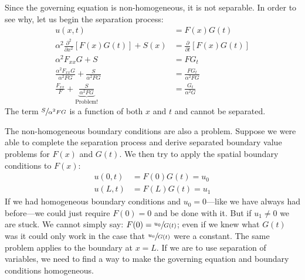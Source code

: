 Since the governing equation is non-homogeneous, it is not separable.  In order to see why, let us begin the separation process:
\begin{align*}
u(x,t) &= F(x)G(t) \\
\alpha^2 \frac{\partial^2}{\partial x^2}\left[F(x)G(t)\right] + S(x) &= \frac{\partial}{\partial t}\left[F(x)G(t)\right] \\
\alpha^2 F_{xx}G + S &= FG_t \\
\frac{\alpha^2 F_{xx}G}{\alpha^2 FG} + \frac{S}{\alpha^2 FG} &= \frac{FG_t}{\alpha^2 FG} \\
\frac{F_{xx}}{F} + \underbrace{\frac{S}{\alpha^2 FG}}_{\text{Problem!}} &= \frac{G_t}{\alpha^2 G}
\end{align*}
The term $\sfrac{S}{\alpha^2 FG}$ is a function of both $x$ and $t$ and cannot be separated.

The non-homogeneous boundary conditions are also a problem.  Suppose we were able to complete the separation process and derive separated boundary value problems for $F(x)$ and $G(t)$.  We then try to apply the spatial boundary conditions to $F(x)$:
\begin{align*}
u(0,t) &= F(0)G(t) = u_0 \\
u(L,t) &= F(L)G(t) = u_1
\end{align*}
If we had homogeneous boundary conditions and $u_0=0$---like we have always had before---we could just require $F(0)=0$ and be done with it.  But if $u_1 \ne 0$ we are stuck.  We cannot simply say: $F(0) = \sfrac{u_0}{G(t)}$; even if we knew what $G(t)$ was it could only work in the case that $\sfrac{u_0}{G(t)}$ were a constant.  The same problem applies to the boundary at $x=L$.  If we are to use separation of variables, we need to find a way to make the governing equation and boundary conditions homogeneous.

\vspace{0.25cm}


